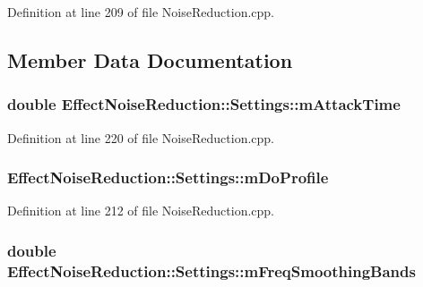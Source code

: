 Definition at line 209 of file Noise\+Reduction.\+cpp.



\subsection{Member Data Documentation}
\subsubsection[{\texorpdfstring{m\+Attack\+Time}{mAttackTime}}]{\setlength{\rightskip}{0pt plus 5cm}double Effect\+Noise\+Reduction\+::\+Settings\+::m\+Attack\+Time}\hypertarget{class_effect_noise_reduction_1_1_settings_a6bb04dd376410dab3a67ecb446a73af1}{}\label{class_effect_noise_reduction_1_1_settings_a6bb04dd376410dab3a67ecb446a73af1}


Definition at line 220 of file Noise\+Reduction.\+cpp.

\subsubsection[{\texorpdfstring{m\+Do\+Profile}{mDoProfile}}]{ Effect\+Noise\+Reduction\+::\+Settings\+::m\+Do\+Profile}\hypertarget{class_effect_noise_reduction_1_1_settings_acf83c314cff3398d8bc172508395d454}{}\label{class_effect_noise_reduction_1_1_settings_acf83c314cff3398d8bc172508395d454}


Definition at line 212 of file Noise\+Reduction.\+cpp.

\subsubsection[{\texorpdfstring{m\+Freq\+Smoothing\+Bands}{mFreqSmoothingBands}}]{\setlength{\rightskip}{0pt plus 5cm}double Effect\+Noise\+Reduction\+::\+Settings\+::m\+Freq\+Smoothing\+Bands}\hypertarget{class_effect_noise_reduction_1_1_settings_a118310261cec68f4f044fc80d88f02fc}{}\label{class_effect_noise_reduction_1_1_settings_a118310261cec68f4f044fc80d88f02fc}


